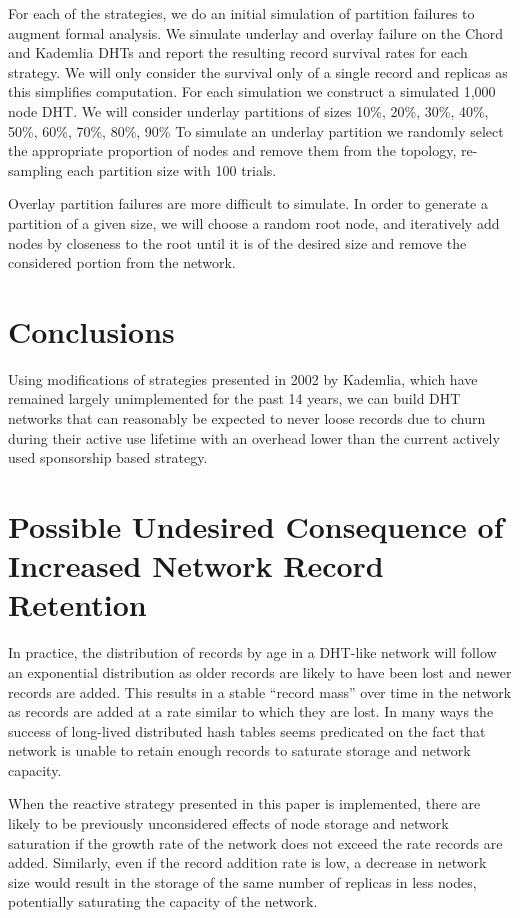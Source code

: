 For each of the strategies, we do an initial simulation of partition failures to augment formal analysis.
We simulate underlay and overlay failure on the Chord and Kademlia DHTs and report the resulting record survival rates for each strategy.
We will only consider the survival only of a single record and replicas as this simplifies computation. 
For each simulation we construct a simulated 1,000 node DHT.
We will consider underlay partitions of sizes 10\%, 20\%, 30\%, 40\%, 50\%, 60\%, 70\%, 80\%, 90\%
To simulate an underlay partition we randomly select the appropriate proportion of nodes and remove them from the topology, re-sampling each partition size with 100 trials.

Overlay partition failures are more difficult to simulate.
In order to generate a partition of a given size, we will choose a random root node, and iteratively add nodes by closeness to the root until it is of the desired size and remove the considered portion from the network. 



\section{Conclusions}

Using modifications of strategies presented in 2002 by Kademlia\cite{kademlia}, which have remained largely unimplemented for the past 14 years, we can build DHT networks that can reasonably be expected to never loose records due to churn during their active use lifetime with an overhead lower than the current actively used sponsorship based strategy.

\section{Possible Undesired Consequence of Increased Network Record Retention}

In practice, the distribution of records by age in a DHT-like network will follow an exponential distribution as older records are likely to have been lost and newer records are added.
This results in a stable ``record mass'' over time in the network as records are added at a rate similar to which they are lost.
In many ways the success of long-lived distributed hash tables seems predicated on the fact that network is unable to retain enough records to saturate storage and network capacity.

When the reactive strategy presented in this paper is implemented, there are likely to be previously unconsidered effects of node storage and network saturation if the growth rate of the network does not exceed the rate records are added.
Similarly, even if the record addition rate is low, a decrease in network size would result in the storage of the same number of replicas in less nodes, potentially saturating the capacity of the network.

